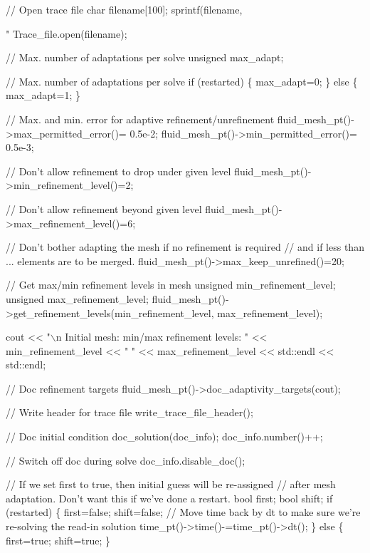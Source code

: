 \begin{DoxyCodeInclude}
{{{{{ \textcolor{comment}{// Open trace file}
 \textcolor{keywordtype}{char} filename[100];   
 sprintf(filename,\textcolor{stringliteral}{"%
 Trace\_file.open(filename);

 \textcolor{comment}{// Max. number of adaptations per solve}
 \textcolor{keywordtype}{unsigned} max\_adapt;

 \textcolor{comment}{// Max. number of adaptations per solve}
 \textcolor{keywordflow}{if} (restarted)
  \{
   max\_adapt=0;
  \}
 \textcolor{keywordflow}{else}
  \{
   max\_adapt=1; 
  \}
 
 \textcolor{comment}{// Max. and min. error for adaptive refinement/unrefinement}
 fluid\_mesh\_pt()->max\_permitted\_error()=  0.5e-2;   
 fluid\_mesh\_pt()->min\_permitted\_error()=  0.5e-3;  

 \textcolor{comment}{// Don't allow refinement to drop under given level}
 fluid\_mesh\_pt()->min\_refinement\_level()=2;

 \textcolor{comment}{// Don't allow refinement beyond given level }
 fluid\_mesh\_pt()->max\_refinement\_level()=6; 

 \textcolor{comment}{// Don't bother adapting the mesh if no refinement is required}
 \textcolor{comment}{// and if less than ... elements are to be merged.}
 fluid\_mesh\_pt()->max\_keep\_unrefined()=20;


 \textcolor{comment}{// Get max/min refinement levels in mesh}
 \textcolor{keywordtype}{unsigned} min\_refinement\_level;
 \textcolor{keywordtype}{unsigned} max\_refinement\_level;
 fluid\_mesh\_pt()->get\_refinement\_levels(min\_refinement\_level,
                                        max\_refinement\_level);

 cout << \textcolor{stringliteral}{"\(\backslash\)n Initial mesh: min/max refinement levels: "} 
      << min\_refinement\_level << \textcolor{stringliteral}{" "} << max\_refinement\_level << std::endl << std::endl;

 \textcolor{comment}{// Doc refinement targets}
 fluid\_mesh\_pt()->doc\_adaptivity\_targets(cout);

 \textcolor{comment}{// Write header for trace file}
 write\_trace\_file\_header();

 \textcolor{comment}{// Doc initial condition}
 doc\_solution(doc\_info);
 doc\_info.number()++;

 \textcolor{comment}{// Switch off doc during solve}
 doc\_info.disable\_doc();

 \textcolor{comment}{// If we set first to true, then initial guess will be re-assigned}
 \textcolor{comment}{// after mesh adaptation. Don't want this if we've done a restart.}
 \textcolor{keywordtype}{bool} first;
 \textcolor{keywordtype}{bool} shift;
 \textcolor{keywordflow}{if} (restarted)
  \{
   first=\textcolor{keyword}{false};
   shift=\textcolor{keyword}{false};
   \textcolor{comment}{// Move time back by dt to make sure we're re-solving the read-in solution}
   time\_pt()->time()-=time\_pt()->dt();
  \}
 \textcolor{keywordflow}{else}
  \{
   first=\textcolor{keyword}{true};
   shift=\textcolor{keyword}{true};
  \}
 
}}}}}}
\end{DoxyCodeInclude}
